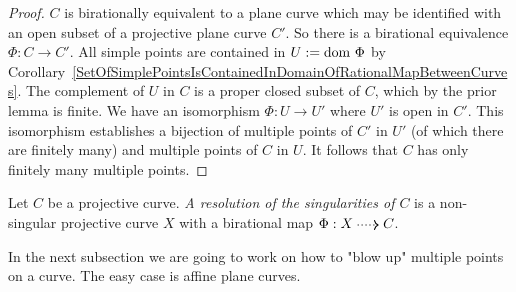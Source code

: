         \begin{proof}
            $C$ is birationally equivalent to a plane curve which may be identified with an open subset of a projective plane curve $C'$. So there is a birational equivalence $\Phi : C \rightarrow C'$. All simple points are contained in $U := \mathrm{dom} \ \Phi$ by Corollary~\ref{SetOfSimplePointsIsContainedInDomainOfRationalMapBetweenCurves}. The complement of $U$ in $C$ is a proper closed subset of $C$, which by the prior lemma is finite. We have an isomorphism $\Phi : U\rightarrow U'$ where $U'$ is open in $C'$. This isomorphism establishes a bijection of multiple points of $C'$ in $U'$ (of which there are finitely many) and multiple points of $C$ in $U$. It follows that $C$ has only finitely many multiple points.       
        \end{proof}
        \begin{definition}
            Let $C$ be a projective curve. \textit{A resolution of the singularities of $C$} is a non-singular projective curve $X$ with a birational map $\Phi : X\dottedarrow C$. 
        \end{definition}
        In the next subsection we are going to work on how to "blow up" multiple points on a curve. The easy case is affine plane curves. 
